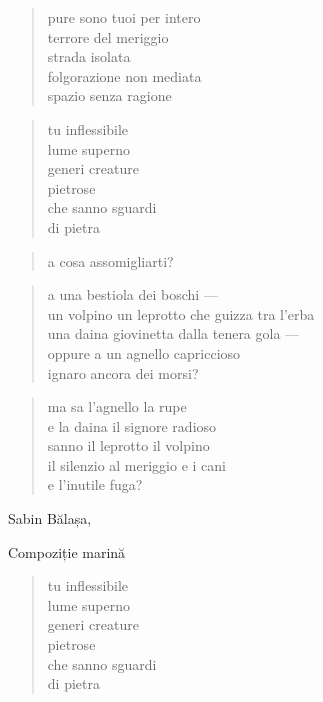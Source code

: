 	\begin{verse}
		pure sono tuoi per intero\\
		terrore del meriggio\\
		strada isolata\\
		folgorazione non mediata\\
		spazio senza ragione
	\end{verse}

	\begin{verse}
		tu inflessibile\\
		lume superno\\
		generi creature\\
		pietrose\\
		che sanno sguardi\\
		di pietra
	\end{verse}

\clearpage


	\begin{verse}
		a cosa assomigliarti?
	\end{verse}

	\begin{verse}
		a una bestiola dei boschi —\\
		un volpino un leprotto che guizza tra l'erba\\
		una daina giovinetta dalla tenera gola —\\
		oppure a un agnello capriccioso\\
		ignaro ancora dei morsi?
	\end{verse}

	\begin{verse}
		ma sa l'agnello la rupe\\
		e la daina il signore radioso\\
		sanno il leprotto il volpino\\
		il silenzio al meriggio e i cani\\
		e l'inutile fuga?
	\end{verse}

\clearpage


\begin{artItem}
	Sabin Bălașa, \begin{otherlanguage}{romanian}%
		Compoziţie marină%
	\end{otherlanguage}
\end{artItem}

	\begin{verse}
		tu inflessibile\\
		lume superno\\
		generi creature\\
		pietrose\\
		che sanno sguardi\\
		di pietra
	\end{verse}

